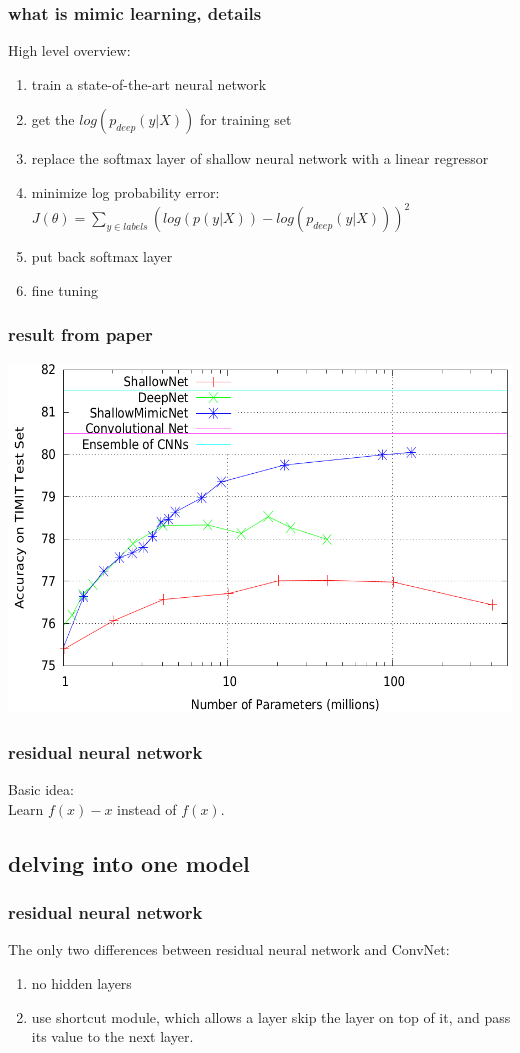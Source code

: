 \documentclass{beamer}
\begin{document}
\begin{frame}
\frametitle{what is mimic learning, details}
High level overview:
\begin{enumerate}
\item train a state-of-the-art neural network
\item get the $log(p_{deep}(y|X))$ for training set
\item replace the softmax layer of shallow neural network with a linear regressor
\item minimize log probability error: $J(\theta)=\sum_{y\in labels}(log(p(y|X))-log(p_{deep}(y|X)))^2$
\item put back softmax layer
\item fine tuning
\end{enumerate}
\end{frame}


\begin{frame}
\frametitle{result from paper}
\includegraphics[width=.8\textwidth]{mimic.png}
\end{frame}

\begin{frame}
\frametitle{residual neural network}
Basic idea:\\
Learn $f(x)-x$ instead of $f(x)$.
\end{frame}
\subsection{delving into one model}


\begin{frame}
\frametitle{residual neural network}
The only two differences between residual neural network and ConvNet:
\begin{enumerate}
\item no hidden layers
\item use shortcut module, which allows a layer skip the layer on top of it,
 and pass its value to the next layer.
\end{enumerate}
\end{frame}
\end{document}
